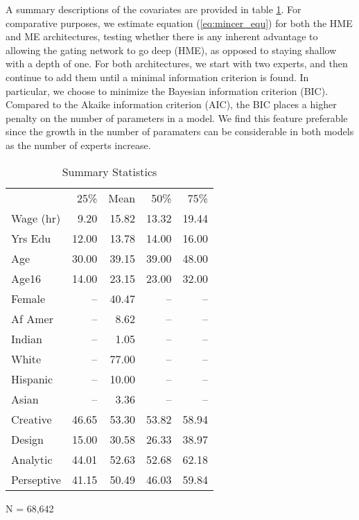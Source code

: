 \documentclass[12pt]{article}
\begin{document}
A summary descriptions of the covariates are provided in table
\ref{tbl:census_cov_summary}. For comparative purposes, we estimate equation
(\ref{eq:mincer_equ}) for both the HME and ME architectures, testing whether
there is any inherent advantage to allowing the gating network to go deep
(HME), as opposed to staying shallow with a depth of one. For both
architectures, we start with two experts, and then continue to add them until
a minimal information criterion is found. In particular, we choose to minimize
the Bayesian information criterion (BIC). Compared to the Akaike information
criterion (AIC), the BIC places a higher penalty on the number of parameters
in a model. We find this feature preferable since the growth in the number
of paramaters can be considerable in both models as the number of experts
increase.

\begin{table} \centering
  \caption{Summary Statistics}
  \begin{threeparttable}
    \begin{tabular}[l]{l r r r r}
  \cmidrule{1-5}

              & 25\%   & Mean & 50\% & 75\%   \\
  \cmidrule{1-5}
  Wage (hr)   & 9.20  & 15.82 & 13.32  & 19.44\\
  Yrs Edu     & 12.00 & 13.78 & 14.00  & 16.00\\
  Age         & 30.00 & 39.15 & 39.00  & 48.00 \\
  Age16       & 14.00 & 23.15 & 23.00  & 32.00 \\
  Female      & --    & 40.47 & --     & --   \\
  Af Amer     & --    &  8.62 & --     & --   \\
  Indian      & --    &  1.05 & --     & --   \\
  White       & --    & 77.00 & --     & --   \\
  Hispanic    & --    & 10.00 & --     & --   \\
  Asian       & --    &  3.36 & --     & --   \\
  Creative    & 46.65 & 53.30 & 53.82  & 58.94 \\
  Design      & 15.00 & 30.58 & 26.33  & 38.97 \\
  Analytic    & 44.01 & 52.63 & 52.68  & 62.18 \\
  Perseptive  & 41.15 & 50.49 & 46.03  & 59.84 \\

  \hline
    \end{tabular}
    \begin{tablenotes}
      \item{\footnotesize N = 68,642}
    \end{tablenotes} \label{tbl:census_cov_summary}
  \end{threeparttable}
\end{table}
\end{document}
